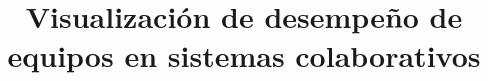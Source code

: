 \documentclass[12pt,letterpaper,spanish]{article}
\begin{document}
\title{Visualización de desempeño de equipos en sistemas colaborativos}


\marginsize{2.5cm}{2.5cm}{3cm}{3cm}
\tableofcontents
\newpage








\newpage


\end{document}
